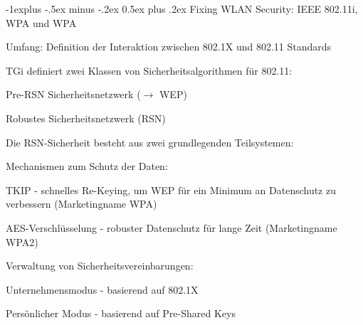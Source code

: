 \documentclass[a4paper]{article}
\makeatletter
\renewcommand{\subsection}{\@startsection{subsection}{2}{0mm}%
 {-1explus -.5ex minus -.2ex}%
 {0.5ex plus .2ex}%
 {\normalfont\normalsize\bfseries}}
\makeatother
\begin{document}
\begin{multicols}{3}
      \subsection{Fixing WLAN Security: IEEE 802.11i, WPA und WPA}
      \begin{itemize*}
            \item Umfang: Definition der Interaktion zwischen 802.1X und 802.11 Standards
            \item TGi definiert zwei Klassen von Sicherheitsalgorithmen für 802.11:
            \begin{itemize*}
                  \item Pre-RSN Sicherheitsnetzwerk ($\rightarrow$ WEP)
                  \item Robustes Sicherheitsnetzwerk (RSN)
            \end{itemize*}
            \item Die RSN-Sicherheit besteht aus zwei grundlegenden Teilsystemen:
            \begin{itemize*}
                  \item Mechanismen zum Schutz der Daten:
                  \begin{itemize*}
                        \item TKIP - schnelles Re-Keying, um WEP für ein Minimum an Datenschutz zu verbessern (Marketingname WPA)
                        \item AES-Verschlüsselung - robuster Datenschutz für lange Zeit (Marketingname WPA2)
                  \end{itemize*}
            \end{itemize*}
            \item Verwaltung von Sicherheitsvereinbarungen:
            \begin{itemize*}
                  \item Unternehmensmodus - basierend auf 802.1X
                  \item Persönlicher Modus - basierend auf Pre-Shared Keys
            \end{itemize*}
      \end{itemize*}


\end{multicols}
\end{document}
